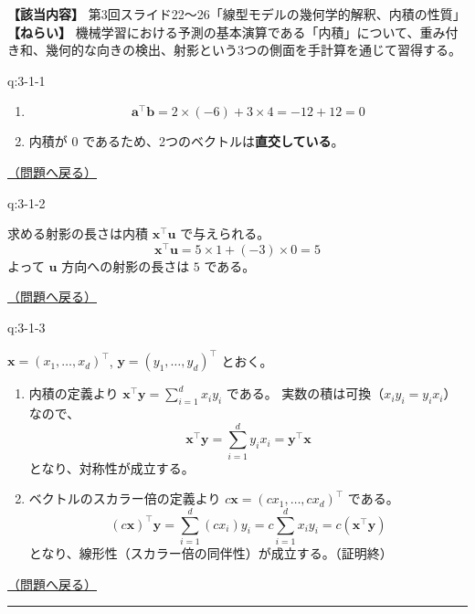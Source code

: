 \textbf{【該当内容】}
第3回スライド22〜26「線型モデルの幾何学的解釈、内積の性質」
\textbf{【ねらい】}
機械学習における予測の基本演算である「内積」について、重み付き和、幾何的な向きの検出、射影という3つの側面を手計算を通じて習得する。

\begin{answerbox}[phantomlabel=a:3-1-1]{q:3-1-1}

\begin{enumerate}
\def\labelenumi{\arabic{enumi}.}
\tightlist
\item
  \[\mathbf{a}^\top \mathbf{b} = 2 \times (-6) + 3 \times 4 = -12 + 12 = 0\]
\item
  内積が \(0\) であるため、2つのベクトルは\textbf{直交している}。
\end{enumerate}

\hfill 

\hyperref[q:3-1-1]{（問題へ戻る）}

\end{answerbox}

\begin{answerbox}[phantomlabel=a:3-1-2]{q:3-1-2}

求める射影の長さは内積 \(\mathbf{x}^\top \mathbf{u}\) で与えられる。 \[
\mathbf{x}^\top \mathbf{u} = 5 \times 1 + (-3) \times 0 = 5
\] よって \(\mathbf{u}\) 方向への射影の長さは \(5\) である。

\hfill 

\hyperref[q:3-1-2]{（問題へ戻る）}

\end{answerbox}

\begin{answerbox}[phantomlabel=a:3-1-3]{q:3-1-3}

\(\mathbf{x} = (x_1, \dots, x_d)^\top\),
\(\mathbf{y} = (y_1, \dots, y_d)^\top\) とおく。

\begin{enumerate}
\def\labelenumi{\arabic{enumi}.}
\tightlist
\item
  内積の定義より \(\mathbf{x}^\top \mathbf{y} = \sum_{i=1}^d x_i y_i\)
  である。 実数の積は可換（\(x_i y_i = y_i x_i\)）なので、 \[
       \mathbf{x}^\top \mathbf{y} = \sum_{i=1}^d y_i x_i = \mathbf{y}^\top \mathbf{x}
       \] となり、対称性が成立する。
\item
  ベクトルのスカラー倍の定義より
  \(c\mathbf{x} = (cx_1, \dots, cx_d)^\top\) である。 \[
       (c\mathbf{x})^\top \mathbf{y} = \sum_{i=1}^d (cx_i)y_i = c \sum_{i=1}^d x_i y_i = c(\mathbf{x}^\top \mathbf{y})
       \] となり、線形性（スカラー倍の同伴性）が成立する。（証明終）
\end{enumerate}

\hfill 

\hyperref[q:3-1-3]{（問題へ戻る）}

\begin{center}\rule{0.5\linewidth}{0.5pt}\end{center}

\end{answerbox}


